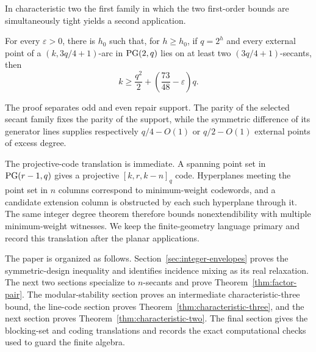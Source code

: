 In characteristic two the first family in which the two first-order bounds
are simultaneously tight yields a second
application.

\begin{theorem}\label{thm:characteristic-two}
For every \(\varepsilon>0\), there is \(h_0\) such that, for \(h\ge h_0\),
if \(q=2^h\) and every external point of a
\((k,3q/4+1)\)-arc in \(\mathrm{PG}(2,q)\) lies on at least two \((3q/4+1)\)-secants,
then
\begin{equation}\label{eq:characteristic-two-bound}
 k\ge \frac{q^2}{2}+\left(\frac{73}{48}-\varepsilon\right)q.
\end{equation}
\end{theorem}

The proof separates odd and even repair support.  The parity of the selected
secant family fixes the parity of the support, while the symmetric difference
of its generator lines supplies respectively \(q/4-O(1)\) or \(q/2-O(1)\)
external points of excess degree.

The projective-code translation is immediate.  A spanning point set in
\(\mathrm{PG}(r-1,q)\) gives a projective \([k,r,k-n]_q\) code.  Hyperplanes meeting
the point set in \(n\) columns correspond to minimum-weight codewords, and a
candidate extension column is obstructed by each such hyperplane through it.
The same integer degree theorem
therefore bounds nonextendibility with multiple minimum-weight witnesses.
We keep the finite-geometry language primary and record this translation
after the planar applications.

The paper is organized as follows.  Section~\ref{sec:integer-envelopes}
proves the symmetric-design inequality and identifies incidence mixing as its
real relaxation.  The next two sections specialize to \(n\)-secants and
prove Theorem~\ref{thm:factor-pair}.  The modular-stability section proves an
intermediate characteristic-three bound, the line-code section proves
Theorem~\ref{thm:characteristic-three}, and the next section proves
Theorem~\ref{thm:characteristic-two}.  The final section gives the blocking-set and
coding translations and records the exact computational checks used to guard
the finite algebra.
